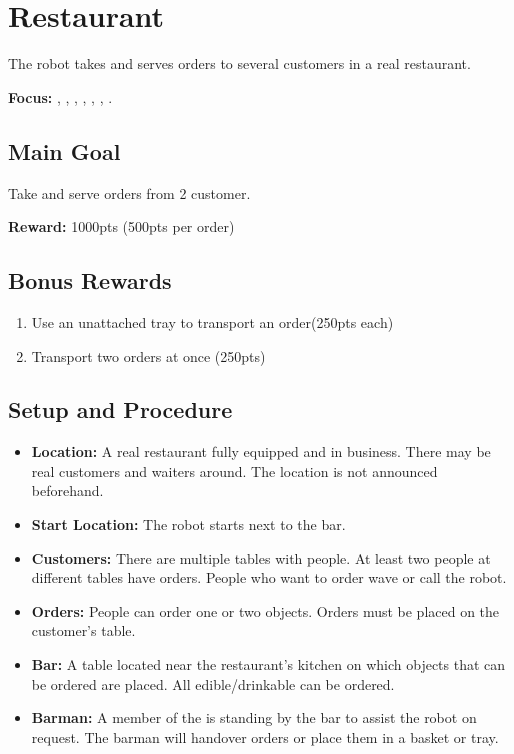 \section{Restaurant}
\label{test:restaurant}
The robot takes and serves orders to several customers in a real restaurant.

\noindent \textbf{Focus:} \SysI{}, \NAV{}, \MAP{}, \HRI{}, \MAN{}, \PerDet{}, \OR{}.

\subsection*{Main Goal}
Take and serve orders from 2 customer.

\noindent\textbf{Reward:} 1000pts (500pts per order)

\subsection*{Bonus Rewards}
\begin{enumerate}[nosep]
	\item Use an unattached tray to transport an order(250pts each)
	\item Transport two orders at once (250pts)
\end{enumerate}

\subsection*{Setup and Procedure}
\begin{itemize}[nosep]
	\item \textbf{Location:} A real restaurant fully equipped and in business. There may be real customers and waiters around. The location is not announced beforehand.

	\item \textbf{Start Location:} The robot starts next to the bar.

	\item \textbf{Customers:} There are multiple tables with people. At least two people at different tables have orders. People who want to order wave or call the robot.
	
	\item \textbf{Orders:} People can order one or two objects. Orders must be placed on the customer's table.

    \item \textbf{Bar:} A table located near the restaurant's kitchen on which objects that can be ordered are placed. All edible/drinkable \KnownObjects{} can be ordered.

	\item \textbf{Barman:} A member of the  is standing by the bar to assist the robot on request. The barman will handover orders or place them in a basket or tray.
\end{itemize}

